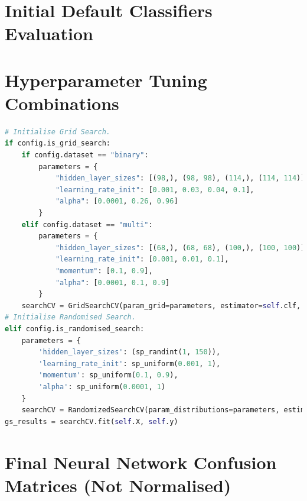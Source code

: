 \documentclass[letterpaper,12pt]{article}
\begin{document}
\begin{appendices}
\clearpage
\section{Initial Default Classifiers Evaluation}
\label{sec:appendix-initial-default-classifiers}





\clearpage
\section{Hyperparameter Tuning Combinations}
\label{sec:appendix-randomised-grid-search}

\begin{lstlisting}[language=Python]
# Initialise Grid Search.
if config.is_grid_search:
    if config.dataset == "binary":
        parameters = {
            "hidden_layer_sizes": [(98,), (98, 98), (114,), (114, 114)],
            "learning_rate_init": [0.001, 0.03, 0.04, 0.1],
            "alpha": [0.0001, 0.26, 0.96]
        }
    elif config.dataset == "multi":
        parameters = {
            "hidden_layer_sizes": [(68,), (68, 68), (100,), (100, 100)],
            "learning_rate_init": [0.001, 0.01, 0.1],
            "momentum": [0.1, 0.9],
            "alpha": [0.0001, 0.1, 0.9]
        }
    searchCV = GridSearchCV(param_grid=parameters, estimator=self.clf, cv=self.folds, scoring=scoring)
# Initialise Randomised Search.
elif config.is_randomised_search:
    parameters = {
        'hidden_layer_sizes': (sp_randint(1, 150)),
        'learning_rate_init': sp_uniform(0.001, 1),
        'momentum': sp_uniform(0.1, 0.9),
        'alpha': sp_uniform(0.0001, 1)
    }
    searchCV = RandomizedSearchCV(param_distributions=parameters, estimator=self.clf, n_iter=100, cv=self.folds, scoring=scoring)
gs_results = searchCV.fit(self.X, self.y)
\end{lstlisting}


\clearpage
\section{Final Neural Network Confusion Matrices (Not Normalised)}
\label{sec:appendix-cm-not-normalised}


\end{appendices}
\end{document}
